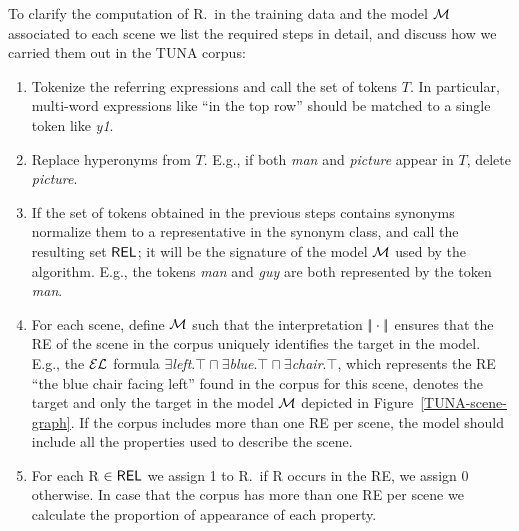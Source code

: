 
To clarify the computation of R.\puse\ in the training data and the model $\mathcal{M}$ associated to each scene we list the required steps in detail, 
and discuss how we carried them out in the TUNA corpus:

\begin{enumerate}
\item Tokenize the referring expressions and call the set of tokens $T$. In particular, multi-word expressions like ``in the top row'' 
should be matched to a single token like \emph{y1}.

\item Replace hyperonyms from $T$. E.g., if both \emph{man} and \emph{picture} appear in $T$, delete \emph{picture}.

\item If the set of tokens obtained in the previous steps contains synonyms normalize them to a representative in the synonym class, 
and call the resulting set $\textsf{REL}$; it will be the signature of the model $\mathcal{M}$ used by the algorithm. E.g., the tokens \emph{man} 
and \emph{guy} are both represented by the token \emph{man}.

\item For each scene, define $\mathcal{M}$ such that the interpretation $|\!|\cdot|\!|$ ensures that the RE of the scene in the corpus uniquely identifies the target in the model. E.g., the $\mathcal{EL}$ formula $\exists$\emph{left}.$\top \sqcap \exists$\emph{blue}.$\top \sqcap \exists$\emph{chair}.$\top$, which represents the RE ``the blue chair facing left'' found in the corpus for this scene, denotes the target and only the target in the model $\mathcal{M}$ depicted in Figure~\ref{TUNA-scene-graph}. If the corpus includes more than one RE per scene, the model should include all the properties used to describe the scene.

\item For each R $\in \textsf{REL}$ we assign 1 to R.\puse\ if R occurs in the RE, we assign 0 otherwise. In case that the corpus has more than one RE per scene we calculate the proportion of appearance of each property.

\end{enumerate}


